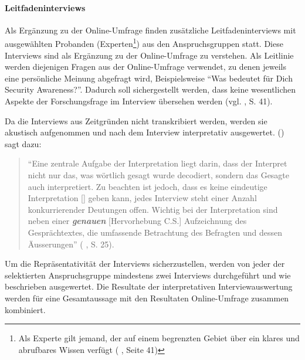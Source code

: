 \documentclass[../../main.tex]{subfiles}
\begin{document}
\paragraph*{Leitfadeninterviews}\mbox{}

\begin{sloppypar}
Als Ergänzung zu der Online-Umfrage finden zusätzliche Leitfadeninterviews mit ausgewählten Probanden (Experten\footnote{Als Experte gilt jemand, der auf einem begrenzten Gebiet über ein klares und abrufbares Wissen verfügt (\citeauthor{mayer_interview_2013} \citeyear{mayer_interview_2013}, Seite 41)}) aus den Anspruchsgruppen statt. Diese Interviews sind als Ergänzung zu der Online-Umfrage zu verstehen. Als Leitlinie werden diejenigen Fragen aus der Online-Umfrage verwendet, zu denen jeweils eine persönliche Meinung abgefragt wird, Beispielsweise "`Was bedeutet für Dich Security Awareness?"'. Dadurch soll sichergestellt werden, dass keine wesentlichen Aspekte der Forschungsfrage im Interview übersehen werden (vgl. \citeauthor{mayer_interview_2013} \citeyear{mayer_interview_2013}, S. 41).

Da die Interviews aus Zeitgründen nicht transkribiert werden, werden sie akustisch aufgenommen und nach dem Interview interpretativ ausgewertet. \citeauthor{mayer_interview_2013} (\citeyear{mayer_interview_2013}) sagt dazu:

\begin{quote}
"`Eine zentrale Aufgabe der Interpretation liegt darin, dass der Interpret nicht nur das, was wörtlich gesagt wurde decodiert, sondern das Gesagte auch interpretiert. Zu beachten ist jedoch, dass es keine eindeutige Interpretation [\textellipsis] geben kann, jedes Interview steht einer Anzahl konkurrierender Deutungen offen. Wichtig bei der Interpretation sind neben einer \textbf{\textit{genauen}} [Hervorhebung C.S.] Aufzeichnung des Gesprächtextes, die umfassende Betrachtung des Befragten und dessen Äusserungen"' (\citeauthor{mayer_interview_2013} \citeyear{mayer_interview_2013}, S. 25).
\end{quote}

Um die Repräsentativität der Interviews sicherzustellen, werden von jeder der selektierten Anspruchsgruppe mindestens zwei Interviews durchgeführt und wie beschrieben ausgewertet. Die Resultate der interpretativen Interviewauswertung werden für eine Gesamtaussage  mit den Resultaten Online-Umfrage zusammen kombiniert.

\end{sloppypar}
\end{document}
